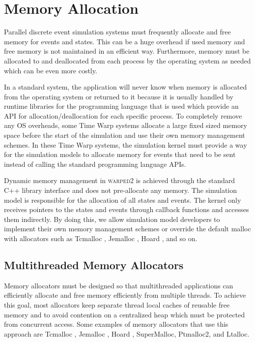 \documentclass[11pt]{book}
\begin{document}
\section{Memory Allocation}

Parallel discrete event simulation systems must frequently allocate and free memory for events and
states.  This can be a huge overhead if used memory and free memory is not maintained in an
efficient way.  Furthermore, memory must be allocated to and deallocated from each process by the
operating system as needed which can be even more costly.

In a standard system, the application will never know when memory is allocated from the operating
system or returned to it because it is usually handled by runtime libraries for the programming
language that is used which provide an API for allocation/deallocation for each specific
process.  To completely remove any OS overheads, some Time Warp systems allocate a large fixed
sized memory space before the start of the simulation and use their own memory management
schemes.  In these Time Warp systems, the simulation kernel must provide a way for the simulation
models to allocate memory for events that need to be sent instead of calling the standard programming
language APIs.

Dynamic memory management in \textsc{warped2} is achieved through the standard C++ library
interface and does not pre-allocate any memory.  The simulation model is responsible for the
allocation of all states and events.  The kernel only receives pointers to the states and events
through callback functions and accesses them indirectly.  By doing this, we allow simulation model
developers to implement their own memory management schemes or override the default malloc with
allocators such as Tcmalloc \cite{tcmalloc}, Jemalloc \cite{evans-06}, Hoard \cite{berger-00},
and so on.

\subsection{Multithreaded Memory Allocators}

Memory allocators must be designed so that multithreaded applications can efficiently allocate
and free memory efficiently from multiple threads.  To achieve this goal, most allocators keep
separate thread local caches of reusable free memory and to avoid contention on a centralized
heap which must be protected from concurrent access.  Some examples of memory allocators that
use this approach are Tcmalloc \cite{tcmalloc}, Jemalloc \cite{evans-06}, Hoard \cite{berger-00},
SuperMalloc\cite{kuszmaul-15}, Ptmalloc2\cite{ptmalloc2}, and Ltalloc\cite{ltalloc}.
\end{document}
